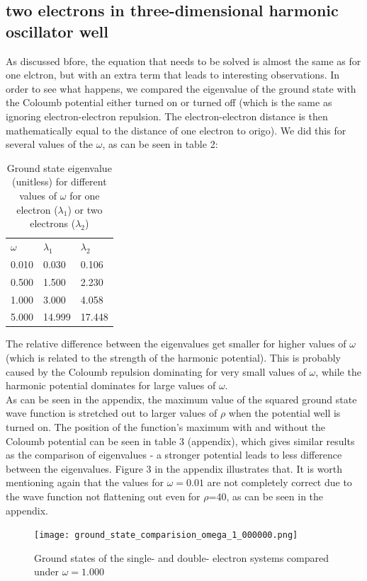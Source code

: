 \documentclass[10pt,a4paper]{article}
\begin{document}
\subsection{two electrons in three-dimensional harmonic oscillator well}
As discussed bfore, the equation that needs to be solved is almost the same as for one elctron, but with an extra term that leads to interesting observations. In order to see what happens, we compared the eigenvalue of the ground state with the Coloumb potential either turned on or turned off (which is the same as ignoring electron-electron repulsion. The electron-electron distance is then mathematically equal to the distance of one electron to origo). We did this for several values of the  $\omega$, as can be seen in table 2:
\begin{table}[H]
\caption[Ground state eigenvalues for one and two electrons]{Ground state eigenvalue (unitless) for different values of $\omega$ for one electron ($\lambda_1$) or two electrons ($\lambda_2$)}
\begin{tabular}{lll}
$\omega$ &$\lambda_1$ & $\lambda_2$  \\
0.010 & 0.030 & 0.106 \\
0.500 &1.500 & 2.230 \\
1.000 &3.000 & 4.058  \\
5.000 &14.999 & 17.448\\
\end{tabular}
\end{table}
The relative difference between the eigenvalues get smaller for higher values of $\omega$ (which is related to the strength of the harmonic potential). This is probably caused by the Coloumb repulsion dominating for very small values of $\omega$, while the harmonic potential dominates for large values of $\omega$. \\
As can be seen in the appendix, the maximum value of the squared ground state wave function is stretched out to larger values of $\rho$ when the potential well is turned on. The position of the function's maximum with and without the Coloumb potential can be seen in table 3 (appendix), which gives similar results as the comparison of eigenvalues - a stronger potential leads to less difference between the eigenvalues. Figure 3 in the appendix illustrates that. It is worth mentioning again that the values for $\omega=0.01$ are not completely correct due to the wave function not flattening out even for $\rho$=40, as can be seen in the appendix.
\begin{figure}[H]
	\texttt{[image: ground\_state\_comparision\_omega\_1\_000000.png]}
	\caption[Ground states of the single- and double- electron systems]{Ground states of the single- and double- electron systems compared under $\omega =1.000$}
\end{figure}
\end{document}
